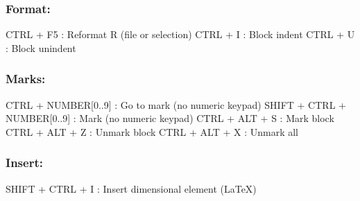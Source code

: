 \subsubsection{Format:}

\vspace{-0.5cm}
\begin{Rtables}[caption={[Format menu keyboard shortcuts]
    Format menu keyboard shortcuts},
  label=menu:format]
  CTRL + F5               : Reformat R (file or selection)
  CTRL + I                : Block indent
  CTRL + U                : Block unindent
\end{Rtables}


\newpage
\subsubsection{Marks:}

\vspace{-0.5cm}
\begin{Rtables}[caption={[Marks menu keyboard shortcuts]
    Marks menu keyboard shortcuts},
  label=menu:marks]
  CTRL  + NUMBER[0..9]        : Go to mark (no numeric keypad)
  SHIFT + CTRL + NUMBER[0..9] : Mark (no numeric keypad)
  CTRL  + ALT  + S            : Mark block
  CTRL  + ALT  + Z            : Unmark block
  CTRL  + ALT  + X            : Unmark all
\end{Rtables}


\subsubsection{Insert:}

\vspace{-0.5cm}
\begin{Rtables}[caption={[Insert menu keyboard shortcuts]
    Insert menu keyboard shortcuts},
  label=menu:insert]
  SHIFT + CTRL + I        : Insert dimensional element (LaTeX)
\end{Rtables}


